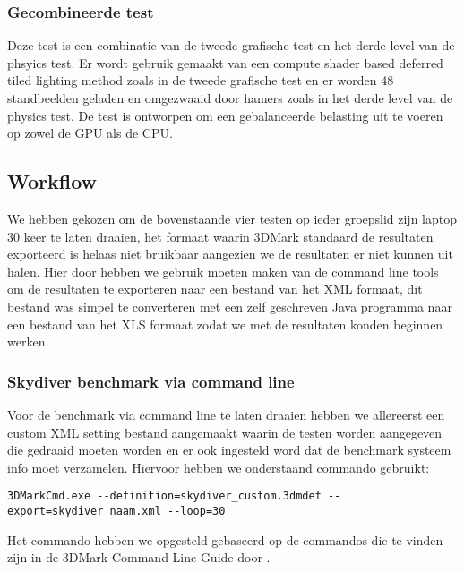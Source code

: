
\subsubsection{Gecombineerde test}
Deze test is een combinatie van de tweede grafische test en het derde level van de phsyics test. Er wordt gebruik gemaakt van een compute shader based deferred tiled lighting method zoals in de tweede grafische test en er worden 48 standbeelden geladen en omgezwaaid door hamers zoals in het derde level van de physics test. De test is ontworpen om een gebalanceerde belasting uit te voeren op zowel de GPU als de CPU. \citep{3dmark_tech}


\subsection{Workflow}
We hebben gekozen om de bovenstaande vier testen op ieder groepslid zijn laptop 30 keer te laten draaien, het formaat waarin 3DMark standaard de resultaten exporteerd is helaas niet bruikbaar aangezien we de resultaten er niet kunnen uit halen. Hier door hebben we gebruik moeten maken van de command line tools om de resultaten te exporteren naar een bestand van het XML formaat, dit bestand was simpel te converteren met een zelf geschreven Java programma naar een bestand van het XLS formaat zodat we met de resultaten konden beginnen werken.

\subsubsection{Skydiver benchmark via command line}
Voor de benchmark via command line te laten draaien hebben we allereerst een custom XML setting bestand aangemaakt waarin de testen worden aangegeven die gedraaid moeten worden en er ook ingesteld word dat de benchmark systeem info moet verzamelen. Hiervoor hebben we onderstaand commando gebruikt:
\begin{lstlisting}
3DMarkCmd.exe --definition=skydiver_custom.3dmdef --export=skydiver_naam.xml --loop=30
\end{lstlisting}
Het commando hebben we opgesteld gebaseerd op de commandos die te vinden zijn in de 3DMark Command Line Guide door \cite{3dmark_cmd}. 
